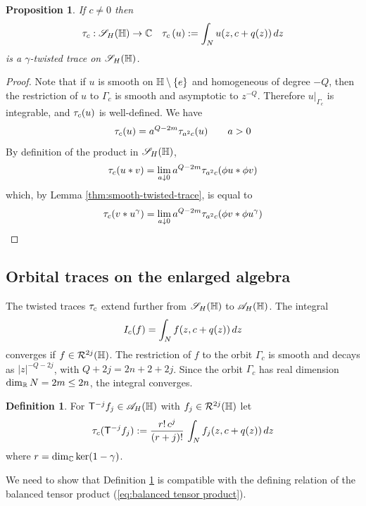\documentclass[11pt]{amsart}
\theoremstyle{plain}
\newtheorem{proposition}[theorem]{Proposition}
\theoremstyle{definition}
\newtheorem{definition}[theorem]{Definition}
\theoremstyle{remark}
\begin{document}
\begin{proposition}\label{prop:twisted orbital traces on symbols}
If $c\ne 0$ then
\begin{equation*}
\tau_{c}:{\mathscr{S}_H}(\mathbb{H})\to {\mathbb{C}} \quad \tau_{c}\left(u\right) := \int_N u(z, c+q(z))\,dz
\end{equation*}
is a $\gamma$-twisted trace on ${\mathscr{S}_H}(\mathbb{H})$.
\end{proposition}
\begin{proof}
Note that if $u$ is smooth on $\mathbb{H}\setminus \{e\}$ and homogeneous of degree $-Q$,
then the restriction of $u$ to $\Gamma_c$ is smooth and asymptotic to $z^{-Q}$.
Therefore $u|_{\Gamma_c}$ is integrable, and $\tau_{c}(u)$ is well-defined.
We have
\[ \tau_{c}(u) = a^{Q-2m}\tau_{a^2c}(u)\qquad a>0\]
By definition of the product in ${\mathscr{S}_H}(\mathbb{H})$,
\[ \tau_{c}(u * v) = \lim_{a\downarrow 0} a^{Q-2m} \tau_{a^2c}(\phi u * \phi v) \]
which, by Lemma \ref{thm:smooth-twisted-trace}, is equal to
\[ \tau_{c}(v * u^\gamma) = \lim_{a\downarrow 0} a^{Q-2m} \tau_{a^2c}(\phi v * \phi u^\gamma) \]
\end{proof}

\subsection{Orbital traces on the enlarged algebra}

The twisted traces $\tau_{c}$ extend further from ${\mathscr{S}_H}(\mathbb{H})$ to ${\mathscr{A}}_H(\mathbb{H})$.
The integral
\[I_{c}(f) = \int_N f(z, c+q(z))\,dz\]
converges if $f\in \mathcal{R}^{2j}(\mathbb{H})$.
The restriction of $f$ to the orbit $\Gamma_c$ is smooth
and decays as $|z|^{-Q-2j}$, with $Q+2j=2n+2+2j$.
Since the orbit $\Gamma_c$ has real dimension $\dim_{\mathbb{R}} N=2m\le 2n$,
the integral converges.

\begin{definition}\label{def:tau_c enlarged}
For $\mathsf{T}^{-j} f_j\in {\mathscr{A}}_H(\mathbb{H})$ with $f_j\in \mathcal{R}^{2j}(\mathbb{H})$ let
\[ \tau_{c}(\mathsf{T}^{-j}f_j):=\frac{r!\,c^j}{(r+j)!} \,\int_N f_j(z, c+q(z))\,dz\]
where $r=\dim_{\mathbb{C}} \ker(1-\gamma)$.
\end{definition}

We need to show that Definition \ref{def:tau_c enlarged} is compatible with the defining relation of the balanced tensor product (\ref{eq:balanced tensor product}).
\end{document}

